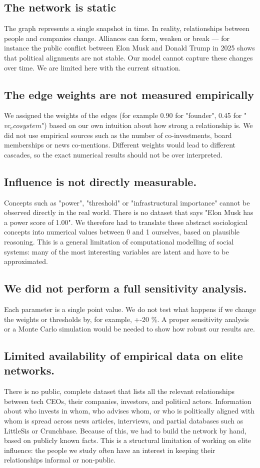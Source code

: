 \documentclass[12pt,a4paper,twocolumn]{article}
\begin{document}
\subsection{The network is static}
The graph represents a single snapshot in time. In reality, relationships between people and companies change. Alliances can form, weaken or break — for instance the public conflict between Elon Musk and Donald Trump in 2025 shows that political alignments are not stable. Our model cannot capture these changes over time. We are limited here with the current situation. 

\subsection{The edge weights are not measured empirically}
We assigned the weights of the edges (for example 0.90 for "founder", 0.45 for "$vc_ecosystem$") based on our own intuition about how strong a relationship is. We did not use empirical sources such as the number of co-investments, board memberships or news co-mentions. Different weights would lead to different cascades, so the exact numerical results should not be over interpreted.

\subsection{Influence is not directly measurable.}
Concepts such as "power", "threshold" or "infrastructural importance" cannot be observed directly in the real world. There is no dataset that says "Elon Musk has a power score of 1.00". We therefore had to translate these abstract sociological concepts into numerical values between 0 and 1 ourselves, based on plausible reasoning. This is a general limitation of computational modelling of social systems: many of the most interesting variables are latent and have to be approximated.

\subsection{We did not perform a full sensitivity analysis.}
Each parameter is a single point value. We do not test what happens if we change the weights or thresholds by, for example, +-20 \%. A proper sensitivity analysis or a Monte Carlo simulation would be needed to show how robust our results are.

\subsection{Limited availability of empirical data on elite networks.}
There is no public, complete dataset that lists all the relevant relationships between tech CEOs, their companies, investors, and political actors. Information about who invests in whom, who advises whom, or who is politically aligned with whom is spread across news articles, interviews, and partial databases such as LittleSis or Crunchbase. Because of this, we had to build the network by hand, based on publicly known facts. This is a structural limitation of working on elite influence: the people we study often have an interest in keeping their relationships informal or non-public.
\end{document}
